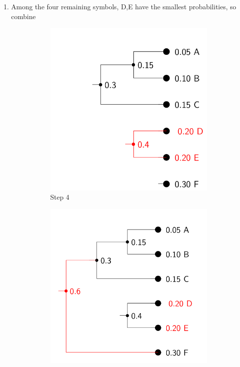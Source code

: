 \documentclass[12pt]{article}
\begin{document}
\begin{itemize}
\begin{enumerate}
\item Among the four remaining symbols, D,E have the smallest probabilities, so combine
\begin{figure}[h]
\begin{subfigure}[h]{0.3\linewidth}
  \includegraphics[width=\linewidth ]{Huff4.png}
  \caption{Step 4}
\end{subfigure}
\begin{subfigure}[h]{0.3\linewidth}
  \includegraphics[width=\linewidth ]{Huff5.png}

\end{subfigure}
\end{figure}
\end{enumerate}
\end{itemize}
\end{document}
